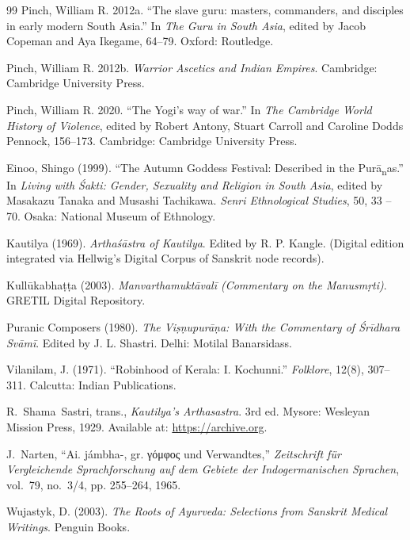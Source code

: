 \documentclass[11pt,twoside,letterpaper]{article}
\begin{document}
\begin{thebibliography}{99}
Pinch, William R. 2012a. ``The slave guru: masters, commanders, and disciples in early modern South Asia.'' In \textit{The Guru in South Asia}, edited by Jacob Copeman and Aya Ikegame, 64–79. Oxford: Routledge.

Pinch, William R. 2012b. \textit{Warrior Ascetics and Indian Empires}. Cambridge: Cambridge University Press.

Pinch, William R. 2020. ``The Yogi’s way of war.'' In \textit{The Cambridge World History of Violence}, edited by Robert Antony, Stuart Carroll and Caroline Dodds Pennock, 156–173. Cambridge: Cambridge University Press.

Einoo, Shingo (1999). ``The Autumn Goddess Festival: Described in the Purā\textsubscript{n}as.'' In \textit{Living with Śakti: Gender, Sexuality and Religion in South Asia}, edited by Masakazu Tanaka and Musashi Tachikawa. \textit{Senri Ethnological Studies}, 50, 33 -- 70. Osaka: National Museum of Ethnology.

Kautilya (1969). \textit{Arthaśāstra of Kautilya}. Edited by R. P. Kangle. (Digital edition integrated via Hellwig's Digital Corpus of Sanskrit node records).

Kullūkabhaṭṭa (2003). \textit{Manvarthamuktāvalī (Commentary on the Manusmṛti)}. GRETIL Digital Repository.

Puranic Composers (1980). \textit{The Viṣṇupurāṇa: With the Commentary of Śrīdhara Svāmī}. Edited by J. L. Shastri. Delhi: Motilal Banarsidass.

Vilanilam, J. (1971). ``Robinhood of Kerala: I. Kochunni.'' \textit{Folklore}, 12(8), 307--311. Calcutta: Indian Publications.

R.~Shama~Sastri, trans., \textit{Kautilya's Arthasastra}. 3rd ed. Mysore: Wesleyan Mission Press, 1929. Available at: \url{https://archive.org}.

J.~Narten, ``Ai. jámbha-, gr. γόμφος und Verwandtes,'' \textit{Zeitschrift für Vergleichende Sprachforschung auf dem Gebiete der Indogermanischen Sprachen}, vol.~79, no.~3/4, pp. 255--264, 1965.

Wujastyk, D. (2003).
\newblock \textit{The Roots of Ayurveda: Selections from Sanskrit Medical Writings}.
\newblock Penguin Books.


\end{thebibliography}
\end{document}

